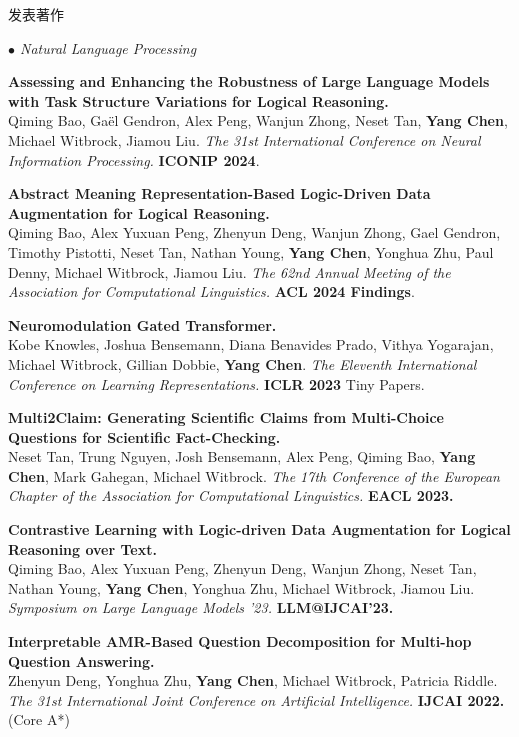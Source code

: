 \documentclass{resume} %
\begin{document}
\begin{rSection}{发表著作}
\begin{rSubsection}{\large\em $\bullet$ Natural Language Processing}{}{}{}
	\item {\bf Assessing and Enhancing the Robustness of Large Language Models with Task Structure Variations for Logical Reasoning.}\\ {Qiming Bao, Ga\"el Gendron, Alex Peng, Wanjun Zhong, Neset Tan, {\bf Yang Chen}, Michael Witbrock, Jiamou Liu.}
{\em The 31st International Conference on Neural Information Processing.} {\bf ICONIP 2024}.
	\item {\bf Abstract Meaning Representation-Based Logic-Driven Data Augmentation for Logical Reasoning.}\\ {Qiming Bao, Alex Yuxuan Peng, Zhenyun Deng, Wanjun Zhong, Gael Gendron, Timothy Pistotti, Neset Tan, Nathan Young, {\bf Yang Chen}, Yonghua Zhu, Paul Denny, Michael Witbrock, Jiamou Liu.}
{\em The 62nd Annual Meeting of the Association for Computational Linguistics.} {\bf ACL 2024 Findings}.
	\item {\bf Neuromodulation Gated Transformer.}\\
Kobe Knowles, Joshua Bensemann, Diana Benavides Prado, Vithya Yogarajan, Michael Witbrock, Gillian Dobbie, \textbf{Yang Chen}. {\em The Eleventh International Conference on Learning Representations.} {\bf ICLR 2023} Tiny Papers.\\
	\item {\bf Multi2Claim: Generating Scientific Claims from Multi-Choice Questions for Scientific Fact-Checking.}\\
Neset Tan, Trung Nguyen, Josh Bensemann, Alex Peng, Qiming Bao, \textbf{Yang Chen}, Mark Gahegan, Michael Witbrock. {\em The 17th Conference of the European Chapter of the Association for Computational Linguistics.} {\bf EACL 2023.}\\
	\item {\bf Contrastive Learning with Logic-driven Data Augmentation for Logical Reasoning over Text.}\\
Qiming Bao, Alex Yuxuan Peng, Zhenyun Deng, Wanjun Zhong, Neset Tan, Nathan Young, \textbf{Yang Chen}, Yonghua Zhu, Michael Witbrock, Jiamou Liu. {\em Symposium on Large Language Models \@IJCAI'23.} {\bf LLM@IJCAI'23.}\\
	\item {\bf Interpretable AMR-Based Question Decomposition for Multi-hop Question Answering.}\\
		Zhenyun Deng, Yonghua Zhu, \textbf{Yang Chen}, Michael Witbrock, Patricia Riddle. {\em The 31st International Joint Conference on Artificial Intelligence.} \textbf{IJCAI 2022.} (Core A*)\\

\end{rSubsection}
\end{rSection}
\end{document}
